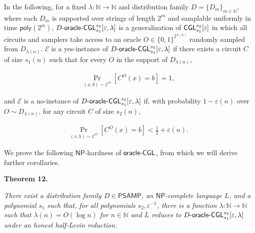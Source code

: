 \documentclass[10pt,a4paper]{article}
\begin{document}
In the following, for a fixed $\lambda:\mathbb{N}\to\mathbb{N}$ and distribution family $D=\{D_{m}\}_{m\in\mathbb{N}}$, where each $D_{m}$ is supported over strings of length $2^{m}$ and samplable uniformly in time ${\mathsf{poly}}(2^{m})$, $D\text{-}{\sf oracle}\text{-}{\sf CGL}_{s_{1}}^{s_{2}}[\varepsilon,\lambda]$ is a generalization of ${\sf CGL}_{s_{1}}^{s_{2}}[\varepsilon]$ in which all circuits and samplers take access to an oracle $O\in\{0,1\}^{2^{\lambda(n)}}$ randomly sampled from $D_{\lambda(n)}$. $\mathcal{E}$ is a yes-instance of $D\text{-}{\sf oracle}\text{-}{\sf CGL}_{s_{1}}^{s_{2}}[\varepsilon,\lambda]$ if there exists a circuit $C$ of size $s_{1}(n)$ such that for every $O$ in the support of $D_{\lambda(n)}$,\par


\[\begin{gathered}
\Pr_{(x,b)\sim\mathcal{E}^{O}}[C^{O}(x)=b]=1,
\end{gathered}\]


and $\mathcal{E}$ is a no-instance of $D\text{-}{\sf oracle}\text{-}{\sf CGL}_{s_{1}}^{s_{2}}[\varepsilon,\lambda]$ if, with probability $1-\varepsilon(n)$ over $O\sim D_{\lambda(n)}$, for any circuit $C$ of size $s_{2}(n)$,\par


\[\begin{gathered}
\Pr_{(x,b)\sim\mathcal{E}^{O}}[C^{O}(x)=b]<\frac{1}{2}+\varepsilon(n).
\end{gathered}\]




We prove the following ${\mathsf{NP}}$-hardness of ${\sf oracle}\text{-}{\sf CGL}$, from which we will derive further corollaries.\par





\par\medskip\noindent\textbf{
\textbf{Theorem 12}\textbf{.}
}\par



\emph{There exist a distribution family $D\in{\mathsf{P}}{\mathsf{SAMP}}$, an ${\mathsf{NP}}$-complete language $L$, and a polynomial $s_{1}$ such that, for all polynomials $s_{2},\varepsilon^{-1}$, there is a function $\lambda:\mathbb{N}\to\mathbb{N}$ such that $\lambda(n)=O(\log n)$ for $n\in\mathbb{N}$ and $L$ reduces to $D\text{-}{\sf oracle}\text{-}{\sf CGL}^{s_{2}}_{s_{1}}[\varepsilon,\lambda]$ under an honest half-Levin reduction.}\par
\end{document}
